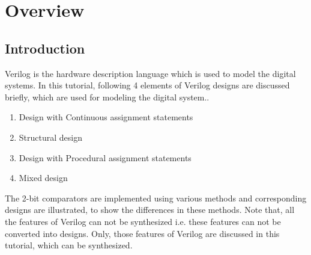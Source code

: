 \chapter{Overview} \label{ch:OverView}

\graphicspath{{Chapters/Overview/Figures/}}

\section{Introduction}
Verilog is the hardware description language which is used to model the digital systems. In this tutorial, following 4 elements of Verilog designs are discussed briefly, which are used for modeling the digital system.. 
\begin{enumerate}
	\item Design with Continuous assignment statements
	\item Structural design
	\item Design with Procedural assignment statements
	\item Mixed design
	
\end{enumerate}

The 2-bit comparators are implemented using various methods and corresponding designs are illustrated, to show the differences in these methods. Note that, all the features of Verilog can not be synthesized i.e. these features can not be converted into designs. Only, those features of Verilog are discussed in this tutorial, which can be synthesized.


